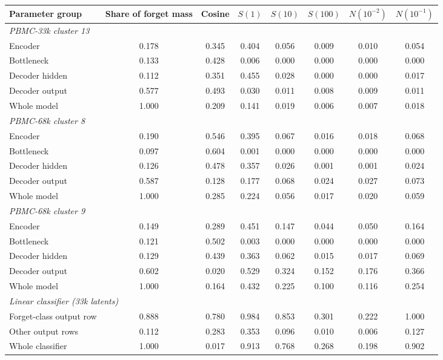 \begin{tabular}{lccccccc}
\toprule
Parameter group & Share of forget mass & Cosine & $S(1)$ & $S(10)$ & $S(100)$ & $N(10^{-2})$ & $N(10^{-1})$ \\
\midrule
\multicolumn{8}{l}{\emph{PBMC-33k cluster 13}} \\
Encoder & 0.178 & 0.345 & 0.404 & 0.056 & 0.009 & 0.010 & 0.054 \\
Bottleneck & 0.133 & 0.428 & 0.006 & 0.000 & 0.000 & 0.000 & 0.000 \\
Decoder hidden & 0.112 & 0.351 & 0.455 & 0.028 & 0.000 & 0.000 & 0.017 \\
Decoder output & 0.577 & 0.493 & 0.030 & 0.011 & 0.008 & 0.009 & 0.011 \\
Whole model & 1.000 & 0.209 & 0.141 & 0.019 & 0.006 & 0.007 & 0.018 \\
\midrule
\multicolumn{8}{l}{\emph{PBMC-68k cluster 8}} \\
Encoder & 0.190 & 0.546 & 0.395 & 0.067 & 0.016 & 0.018 & 0.068 \\
Bottleneck & 0.097 & 0.604 & 0.001 & 0.000 & 0.000 & 0.000 & 0.000 \\
Decoder hidden & 0.126 & 0.478 & 0.357 & 0.026 & 0.001 & 0.001 & 0.024 \\
Decoder output & 0.587 & 0.128 & 0.177 & 0.068 & 0.024 & 0.027 & 0.073 \\
Whole model & 1.000 & 0.285 & 0.224 & 0.056 & 0.017 & 0.020 & 0.059 \\
\midrule
\multicolumn{8}{l}{\emph{PBMC-68k cluster 9}} \\
Encoder & 0.149 & 0.289 & 0.451 & 0.147 & 0.044 & 0.050 & 0.164 \\
Bottleneck & 0.121 & 0.502 & 0.003 & 0.000 & 0.000 & 0.000 & 0.000 \\
Decoder hidden & 0.129 & 0.439 & 0.363 & 0.062 & 0.015 & 0.017 & 0.069 \\
Decoder output & 0.602 & 0.020 & 0.529 & 0.324 & 0.152 & 0.176 & 0.366 \\
Whole model & 1.000 & 0.164 & 0.432 & 0.225 & 0.100 & 0.116 & 0.254 \\
\midrule
\multicolumn{8}{l}{\emph{Linear classifier (33k latents)}} \\
Forget-class output row & 0.888 & 0.780 & 0.984 & 0.853 & 0.301 & 0.222 & 1.000 \\
Other output rows & 0.112 & 0.283 & 0.353 & 0.096 & 0.010 & 0.006 & 0.127 \\
Whole classifier & 1.000 & 0.017 & 0.913 & 0.768 & 0.268 & 0.198 & 0.902 \\
\bottomrule
\end{tabular}
